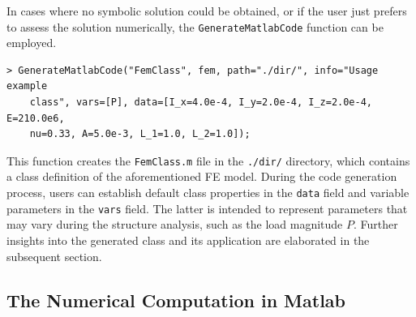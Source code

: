 In cases where no symbolic solution could be obtained, or if the user just prefers to assess the solution numerically, the \texttt{GenerateMatlabCode} function can be employed.
%
\begin{verbatim}
> GenerateMatlabCode("FemClass", fem, path="./dir/", info="Usage example
    class", vars=[P], data=[I_x=4.0e-4, I_y=2.0e-4, I_z=2.0e-4, E=210.0e6,
    nu=0.33, A=5.0e-3, L_1=1.0, L_2=1.0]);
\end{verbatim}
%
This function creates the \texttt{FemClass.m} file in the \texttt{./dir/} directory, which contains a class definition of the aforementioned \ac{FE} model. During the code generation process, users can establish default class properties in the \texttt{data} field and variable parameters in the \texttt{vars} field. The latter is intended to represent parameters that may vary during the structure analysis, such as the load magnitude $P$. Further insights into the generated class and its application are elaborated in the subsequent section.

\subsection[The Numerical Computation in \Matlab{}]{The Numerical Computation in Matlab}
\label{app4:subsec:numerical_computation}

